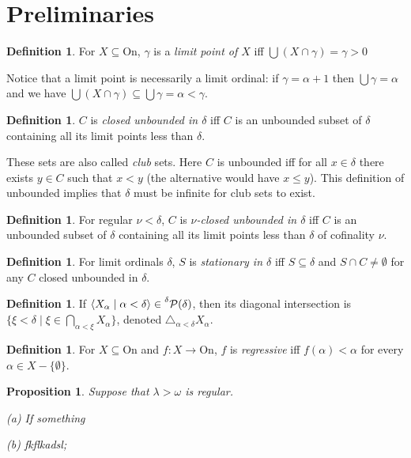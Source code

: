 \documentclass{article}
\newtheorem{proposition}[theorem]{Proposition}
\theoremstyle{definition}
\newtheorem{definition}[theorem]{Definition}
\theoremstyle{remark}
\newtheorem*{remark}{Remark}
\begin{document}
\section{Preliminaries}
\begin{definition}

	For $X\subseteq \textrm{On}$, $\gamma$ is a \emph{limit point of $X$} iff $\bigcup (X \cap \gamma) = \gamma > 0$
\end{definition}
	Notice that a limit point is necessarily a limit ordinal: if $\gamma = \alpha +1$ then $\bigcup \gamma = \alpha$ and we have $ \bigcup (X \cap \gamma) \subseteq \bigcup \gamma  = \alpha < \gamma$.
\begin{definition}
	$C$ is \emph{closed unbounded in $\delta$} iff $C$ is an unbounded subset of $\delta$ containing all its limit points less than $\delta$. 
\end{definition}
These sets are also called \emph{club} sets. Here $C$ is unbounded iff for all $x\in \delta$ there exists $y \in C$ such that $x<y$ (the alternative would have $x\leq y$). This definition of unbounded implies that $\delta$ must be infinite for club sets to exist.
\begin{definition}
	For regular $\nu < \delta$, $C$ is \emph{$\nu$-closed unbounded in $\delta$} iff $C$ is an unbounded subset of $\delta$ containing all its limit points less than $\delta$ of cofinality $\nu$. 
\end{definition}
\begin{definition}
	For limit ordinals $\delta$, $S$ is \emph{stationary in $\delta$} iff $S \subseteq \delta$ and $S\cap C \neq \emptyset$ for any $C$ closed unbounded in $\delta$. 
\end{definition}
\begin{definition}
	If $\langle X_\alpha \mid \alpha < \delta \rangle \in \prescript{\delta}{} {\mathcal{P}(\delta)}$, then its diagonal intersection is $\{ \xi < \delta \mid \xi \in \bigcap_{\alpha<\xi} X_\alpha \}$, denoted $\triangle_{\alpha < \delta} X_\alpha$.
\end{definition}

\begin{definition}
	For $X\subseteq \text{On}$ and $f: X \to \text{On}$, $f$ is \emph{regressive} iff $f(\alpha) < \alpha$ for every $\alpha \in X - \{\emptyset \}$.
\end{definition}

\begin{proposition}
	Suppose that $\lambda > \omega$ is regular. \par
	(a) If something \par
	(b) fkflkadsl;
\end{proposition}
\end{document}
